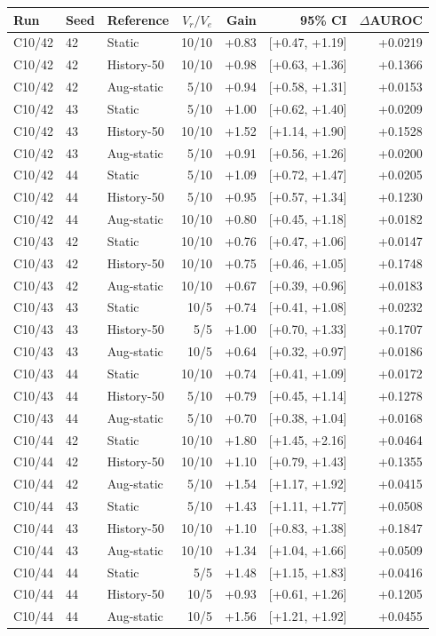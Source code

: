 \begin{tabular}{lllrrrr}
\toprule
Run & Seed & Reference & $V_r/V_e$ & Gain & 95\% CI & $\Delta$AUROC \\
\midrule
C10/42 & 42 & Static & 10/10 & +0.83 & [+0.47, +1.19] & +0.0219 \\
C10/42 & 42 & History-50 & 10/10 & +0.98 & [+0.63, +1.36] & +0.1366 \\
C10/42 & 42 & Aug-static & 5/10 & +0.94 & [+0.58, +1.31] & +0.0153 \\
C10/42 & 43 & Static & 5/10 & +1.00 & [+0.62, +1.40] & +0.0209 \\
C10/42 & 43 & History-50 & 10/10 & +1.52 & [+1.14, +1.90] & +0.1528 \\
C10/42 & 43 & Aug-static & 5/10 & +0.91 & [+0.56, +1.26] & +0.0200 \\
C10/42 & 44 & Static & 5/10 & +1.09 & [+0.72, +1.47] & +0.0205 \\
C10/42 & 44 & History-50 & 5/10 & +0.95 & [+0.57, +1.34] & +0.1230 \\
C10/42 & 44 & Aug-static & 10/10 & +0.80 & [+0.45, +1.18] & +0.0182 \\
C10/43 & 42 & Static & 10/10 & +0.76 & [+0.47, +1.06] & +0.0147 \\
C10/43 & 42 & History-50 & 10/10 & +0.75 & [+0.46, +1.05] & +0.1748 \\
C10/43 & 42 & Aug-static & 10/10 & +0.67 & [+0.39, +0.96] & +0.0183 \\
C10/43 & 43 & Static & 10/5 & +0.74 & [+0.41, +1.08] & +0.0232 \\
C10/43 & 43 & History-50 & 5/5 & +1.00 & [+0.70, +1.33] & +0.1707 \\
C10/43 & 43 & Aug-static & 10/5 & +0.64 & [+0.32, +0.97] & +0.0186 \\
C10/43 & 44 & Static & 10/10 & +0.74 & [+0.41, +1.09] & +0.0172 \\
C10/43 & 44 & History-50 & 5/10 & +0.79 & [+0.45, +1.14] & +0.1278 \\
C10/43 & 44 & Aug-static & 5/10 & +0.70 & [+0.38, +1.04] & +0.0168 \\
C10/44 & 42 & Static & 10/10 & +1.80 & [+1.45, +2.16] & +0.0464 \\
C10/44 & 42 & History-50 & 10/10 & +1.10 & [+0.79, +1.43] & +0.1355 \\
C10/44 & 42 & Aug-static & 5/10 & +1.54 & [+1.17, +1.92] & +0.0415 \\
C10/44 & 43 & Static & 5/10 & +1.43 & [+1.11, +1.77] & +0.0508 \\
C10/44 & 43 & History-50 & 10/10 & +1.10 & [+0.83, +1.38] & +0.1847 \\
C10/44 & 43 & Aug-static & 10/10 & +1.34 & [+1.04, +1.66] & +0.0509 \\
C10/44 & 44 & Static & 5/5 & +1.48 & [+1.15, +1.83] & +0.0416 \\
C10/44 & 44 & History-50 & 10/5 & +0.93 & [+0.61, +1.26] & +0.1205 \\
C10/44 & 44 & Aug-static & 10/5 & +1.56 & [+1.21, +1.92] & +0.0455 \\
\bottomrule
\end{tabular}
